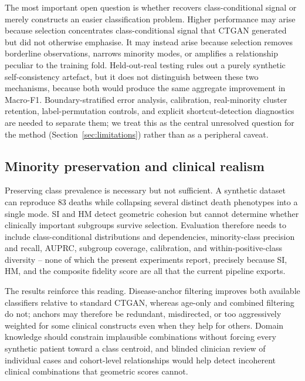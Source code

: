 The most important open question is whether \sepa{} recovers class-conditional signal or merely constructs an easier classification problem. Higher \tstr{} performance may arise because selection concentrates class-conditional signal that CTGAN generated but did not otherwise emphasise. It may instead arise because selection removes borderline observations, narrows minority modes, or amplifies a relationship peculiar to the training fold. Held-out-real testing rules out a purely synthetic self-consistency artefact, but it does not distinguish between these two mechanisms, because both would produce the same aggregate improvement in Macro-F1. Boundary-stratified error analysis, calibration, real-minority cluster retention, label-permutation controls, and explicit shortcut-detection diagnostics are needed to separate them; we treat this as the central unresolved question for the method (Section~\ref{sec:limitations}) rather than as a peripheral caveat.

\subsection{Minority preservation and clinical realism}
\label{sec:minority}

Preserving class prevalence is necessary but not sufficient. A synthetic dataset can reproduce 83 deaths while collapsing several distinct death phenotypes into a single mode. SI and HM detect geometric cohesion but cannot determine whether clinically important subgroups survive selection. Evaluation therefore needs to include class-conditional distributions and dependencies, minority-class precision and recall, AUPRC, subgroup coverage, calibration, and within-positive-class diversity -- none of which the present experiments report, precisely because SI, HM, and the composite fidelity score are all that the current pipeline exports.

The \dacpf{} results reinforce this reading. Disease-anchor filtering improves both available classifiers relative to standard CTGAN, whereas age-only and combined filtering do not; anchors may therefore be redundant, misdirected, or too aggressively weighted for some clinical constructs even when they help for others. Domain knowledge should constrain implausible combinations without forcing every synthetic patient toward a class centroid, and blinded clinician review of individual cases and cohort-level relationships would help detect incoherent clinical combinations that geometric scores cannot.

